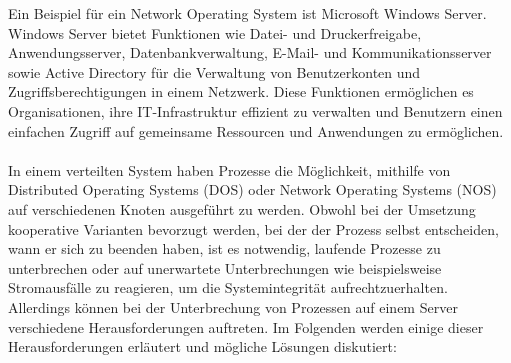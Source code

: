 Ein Beispiel für ein Network Operating System ist Microsoft Windows Server. Windows Server bietet Funktionen wie Datei- und Druckerfreigabe, Anwendungsserver, Datenbankverwaltung, E-Mail- und Kommunikationsserver sowie Active Directory für die Verwaltung von Benutzerkonten und Zugriffsberechtigungen in einem Netzwerk. Diese Funktionen ermöglichen es Organisationen, ihre IT-Infrastruktur effizient zu verwalten und Benutzern einen einfachen Zugriff auf gemeinsame Ressourcen und Anwendungen zu ermöglichen.
\\\\
In einem verteilten System haben Prozesse die Möglichkeit, mithilfe von Distributed Operating Systems (DOS) oder Network Operating Systems (NOS) auf verschiedenen Knoten ausgeführt zu werden. Obwohl bei der Umsetzung  kooperative Varianten bevorzugt werden, bei der der Prozess selbst entscheiden, wann er sich zu beenden haben, ist es notwendig, laufende Prozesse zu unterbrechen oder auf unerwartete Unterbrechungen wie beispielsweise Stromausfälle zu reagieren, um die Systemintegrität aufrechtzuerhalten. Allerdings können bei der Unterbrechung von Prozessen auf einem Server verschiedene Herausforderungen auftreten. Im Folgenden werden einige dieser Herausforderungen erläutert und mögliche Lösungen diskutiert:
